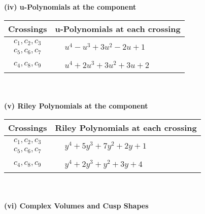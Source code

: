 \documentclass[1p]{elsarticle_modified}
\theoremstyle{definition}
\begin{document}
\newpage\renewcommand{\arraystretch}{1}
\flushleft \textbf{(iv) u-Polynomials at the component}\newline \\
\begin{tabular}{m{50pt}|m{274pt}}
Crossings & \hspace{64pt}u-Polynomials at each crossing \\
\hline $$\begin{aligned}c_{1},c_{2},c_{3}\\c_{5},c_{6},c_{7}\end{aligned}$$&$\begin{aligned}
&u^4- u^3+3 u^2-2 u+1
\end{aligned}$\\
\hline $$\begin{aligned}c_{4},c_{8},c_{9}\end{aligned}$$&$\begin{aligned}
&u^4+2 u^3+3 u^2+3 u+2
\end{aligned}$\\
\hline
\end{tabular}\\~\\
\newpage\renewcommand{\arraystretch}{1}
\flushleft \textbf{(v) Riley Polynomials at the component}\newline \\
\begin{tabular}{m{50pt}|m{274pt}}
Crossings & \hspace{64pt}Riley Polynomials at each crossing \\
\hline $$\begin{aligned}c_{1},c_{2},c_{3}\\c_{5},c_{6},c_{7}\end{aligned}$$&$\begin{aligned}
&y^4+5 y^3+7 y^2+2 y+1
\end{aligned}$\\
\hline $$\begin{aligned}c_{4},c_{8},c_{9}\end{aligned}$$&$\begin{aligned}
&y^4+2 y^3+y^2+3 y+4
\end{aligned}$\\
\hline
\end{tabular}\\~\\
\newpage\flushleft \textbf{(vi) Complex Volumes and Cusp Shapes}
\end{document}

